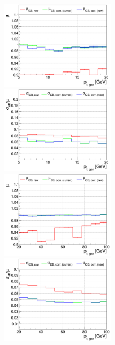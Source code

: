 \begin{figure}
\includegraphics[width=0.495\textwidth]{./plots_pdf/ECAL_plots/plotsPU/EE/FULL/pdf/GENPT/EEFULL_GENPT_0005_0020_MuOverBins.pdf}
\includegraphics[width=0.495\textwidth]{./plots_pdf/ECAL_plots/plotsPU/EE/FULL/pdf/GENPT/EEFULL_GENPT_0005_0020_EffSigmaOverBins.pdf}
\includegraphics[width=0.495\textwidth]{./plots_pdf/ECAL_plots/plotsPU/EE/FULL/pdf/GENPT/EEFULL_GENPT_0020_0100_MuOverBins.pdf}
\includegraphics[width=0.495\textwidth]{./plots_pdf/ECAL_plots/plotsPU/EE/FULL/pdf/GENPT/EEFULL_GENPT_0020_0100_EffSigmaOverBins.pdf}

\end{figure}

